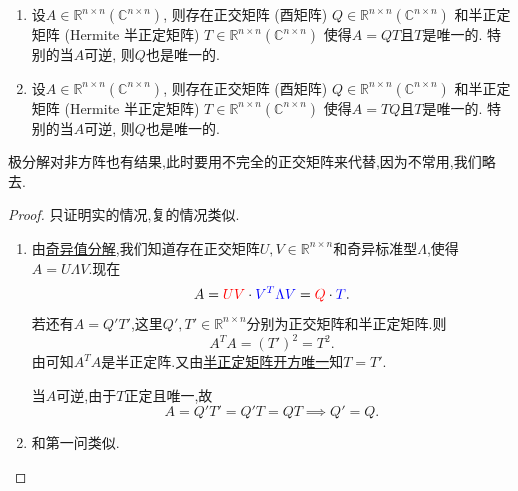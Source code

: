 \documentclass[../../main.tex]{subfiles}%
\begin{document}
\begin{theorem}[极分解]\label{theorem:极分解}
\begin{enumerate}
\item 设\( A \in \mathbb{R}^{n \times n} (\mathbb{C}^{n \times n}) \), 则存在正交矩阵 (酉矩阵) \( Q \in \mathbb{R}^{n \times n} (\mathbb{C}^{n \times n}) \) 和半正定矩阵 (Hermite 半正定矩阵) \( T \in \mathbb{R}^{n \times n} (\mathbb{C}^{n \times n}) \) 使得\( A = QT \)且\( T \)是唯一的. 特别的当\( A \)可逆, 则\( Q \)也是唯一的.

\item 设\( A \in \mathbb{R}^{n \times n} (\mathbb{C}^{n \times n}) \), 则存在正交矩阵 (酉矩阵) \( Q \in \mathbb{R}^{n \times n} (\mathbb{C}^{n \times n}) \) 和半正定矩阵 (Hermite 半正定矩阵) \( T \in \mathbb{R}^{n \times n} (\mathbb{C}^{n \times n}) \) 使得\( A = TQ \)且\( T \)是唯一的. 特别的当\( A \)可逆, 则\( Q \)也是唯一的.
\end{enumerate}
\end{theorem}
\begin{note}
极分解对非方阵也有结果,此时要用不完全的正交矩阵来代替,因为不常用,我们略去.
\end{note}
\begin{proof}
只证明实的情况,复的情况类似.
\begin{enumerate}
\item 由\hyperref[theorem:奇异值分解]{奇异值分解},我们知道存在正交矩阵\( U, V \in \mathbb{R}^{n \times n} \)和奇异标准型\( \Lambda \),使得\( A = U \Lambda V \).现在
\[
A = {\color{red} UV} \cdot {\color{blue} V^T \Lambda V} = {\color{red} Q} \cdot {\color{blue} T}.
\]
若还有\( A = Q'T' \),这里\( Q', T' \in \mathbb{R}^{n \times n} \)分别为正交矩阵和半正定矩阵.则
\[
A^T A = (T')^2 = T^2.
\]
由可知$A^TA$是半正定阵.又由\hyperref[theorem:半正定矩阵开方唯一]{半正定矩阵开方唯一}知\( T = T' \).

当\( A \)可逆,由于\( T \)正定且唯一,故
\[
A = Q'T' =Q'T= QT \implies Q' = Q.
\]

\item 和第一问类似.
\end{enumerate}
\end{proof}
\end{document}
